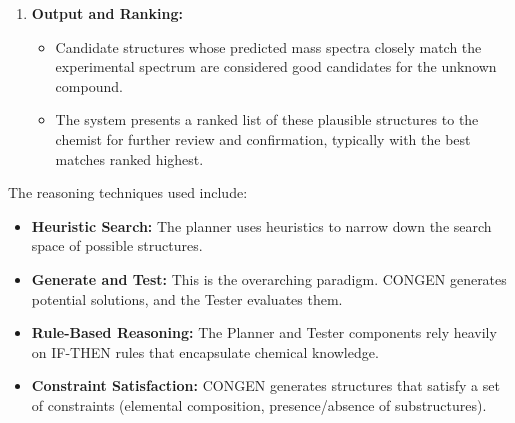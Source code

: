 \documentclass[12pt,a4paper]{article}
\begin{document}
\begin{enumerate}
    \item \textbf{Output and Ranking:}
        \begin{itemize}
            \item Candidate structures whose predicted mass spectra closely match the experimental spectrum are considered good candidates for the unknown compound.
            \item The system presents a ranked list of these plausible structures to the chemist for further review and confirmation, typically with the best matches ranked highest.
        \end{itemize}
\end{enumerate}

The reasoning techniques used include:
\begin{itemize}
    \item \textbf{Heuristic Search:} The planner uses heuristics to narrow down the search space of possible structures.
    \item \textbf{Generate and Test:} This is the overarching paradigm. CONGEN generates potential solutions, and the Tester evaluates them.
    \item \textbf{Rule-Based Reasoning:} The Planner and Tester components rely heavily on IF-THEN rules that encapsulate chemical knowledge.
    \item \textbf{Constraint Satisfaction:} CONGEN generates structures that satisfy a set of constraints (elemental composition, presence/absence of substructures).
\end{itemize}
\end{document}
